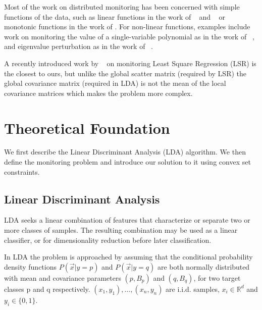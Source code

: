 Most of the work on distributed monitoring has been concerned with simple
functions of the data, such as
linear functions in the work of ~\cite{keralapura2006communication} and ~\cite{kashyap2008efficient} or monotonic functions in the work of \cite{michel2005klee}.
For non-linear functions, examples include work on monitoring the value
of a single-variable polynomial as in the work of ~\cite{shah2008handling},
and eigenvalue perturbation as in the work of ~\cite{huang2007communication}.

A recently introduced work by ~\cite{gabel2015monitoring} on monitoring Least Square 
Regression (LSR) is the closest to ours, 
but unlike the global scatter matrix (required by LSR) the global
covariance matrix (required in LDA) is not the mean of the 
local covariance matrices which makes the problem more complex.


\section{Theoretical Foundation}
We first describe the Linear Discriminant Analysis (LDA) algorithm.
We then define the monitoring problem and introduce our solution to it
using convex set constraints.

\subsection{Linear Discriminant Analysis}%
LDA seeks a linear combination of features that characterize or separate two or more classes of samples.
The resulting combination may be used as a linear classifier, or for dimensionality reduction before later classification.

In LDA the problem is approached by assuming that the conditional probability
density functions $P(\vec x|y=p)$ and $P(\vec x|y=q)$ are both normally distributed with
mean and covariance parameters $(p, B_p)$ and
$(q, B_q)$, for two target classes p and q respectively.
${(x_1,y_1),\ldots,(x_n,y_n)}$ are i.i.d. samples, $x_i \in \mathbb{R}^d$
and $y_i \in \{0,1\}$.

